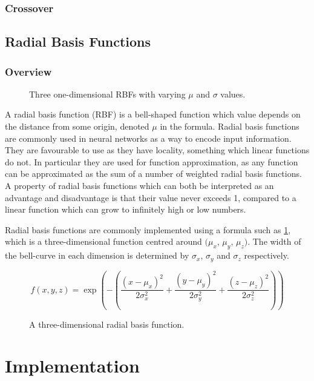 \documentclass[a4paper,11pt]{kth-mag}
\begin{document}
\subsection{Crossover}

\section{Radial Basis Functions}
\subsection{Overview}

\begin{figure}
\caption{Three one-dimensional RBFs with varying $\mu$ and $\sigma$ values.}
\end{figure}

A radial basis function (RBF) is a bell-shaped function which value depends on the distance from some origin, denoted $\mu$ in the formula.  Radial basis functions are commonly used in neural networks as a way to encode input information. They are favourable to use as they have locality, something which linear functions do not. In particular they are used for function approximation, as any function can be approximated as the sum of a number of weighted radial basis functions. A property of radial basis functions which can both be interpreted as an advantage and disadvantage is that their value never exceeds 1, compared to a linear function which can grow to infinitely high or low numbers.

Radial basis functions are commonly implemented using a formula such as \ref{RBF_1}, which is a three-dimensional function centred around $(\mu _{x}$, $\mu _{y}$, $\mu _{z})$. The width of the bell-curve in each dimension is determined by $\sigma _{x}$, $\sigma _{y}$ and $\sigma _{z}$ respectively.

\begin{figure}
\begin{equation}
f(x,y,z) = \exp(-(\frac{(x-\mu_{x})^{2}}{2 \sigma _{x}^{2}} + \frac{(y-\mu_{y})^{2}}{2 \sigma _{y}^{2}} + \frac{(z-\mu_{z})^{2}}{2 \sigma _{z}^{2}}))
\end{equation}
\caption{A three-dimensional radial basis function.\label{RBF_1}}
\end{figure}

\chapter{Implementation}
\end{document}

